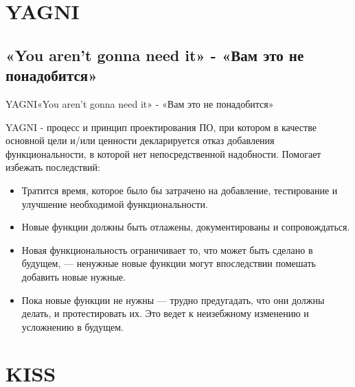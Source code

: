 \documentclass[10pt]{beamer}
\begin{document}
\section{YAGNI}
\subsection{«You aren't gonna need it» - «Вам это не понадобится»}
\begin{frame}[fragile]{YAGNI}{«You aren't gonna need it» - «Вам это не понадобится»}

YAGNI - процесс и принцип проектирования ПО, при котором в качестве основной цели и/или ценности декларируется отказ добавления функциональности, в которой нет непосредственной надобности.
Помогает избежать последствий:
    \begin{itemize}
        \item Тратится время, которое было бы затрачено на добавление, тестирование и улучшение необходимой функциональности.
        \item Новые функции должны быть отлажены, документированы и сопровождаться.
        \item Новая функциональность ограничивает то, что может быть сделано в будущем, — ненужные новые функции могут впоследствии помешать добавить новые нужные.
        \item Пока новые функции не нужны — трудно  предугадать, что они должны делать, и протестировать их. Это ведет к неизебжному изменению и усложнению в будущем.
    \end{itemize}
\end{frame}

\section{KISS}
\end{document}
